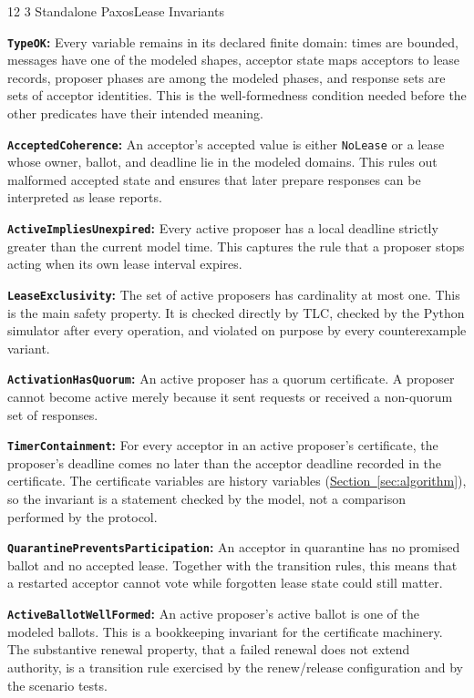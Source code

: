 \documentclass[final,5p,times,twocolumn,number]{elsarticle}
\makeatletter
\newcommand{\code}[1]{\texttt{#1}}
\newcommand{\invitem}[1]{\smallskip\noindent\textbf{#1:} }
\newcommand{\secref}[1]{\hyperref[#1]{Section~\ref*{#1}}}
\renewcommand\subsection{\@startsection{subsection}{2}{\z@}%
           {12\p@ \@plus 6\p@ \@minus 3\p@}%
           {3\p@ \@plus 6\p@ \@minus 3\p@}%
           {\normalfont\normalsize\bfseries}}
\makeatother
\begin{document}
\subsection{Standalone PaxosLease Invariants}

\invitem{\code{TypeOK}}Every variable remains in its declared finite domain: times are bounded, messages have one of the modeled shapes, acceptor state maps acceptors to lease records, proposer phases are among the modeled phases, and response sets are sets of acceptor identities.  This is the well-formedness condition needed before the other predicates have their intended meaning.

\invitem{\code{AcceptedCoherence}}An acceptor's accepted value is either \code{NoLease} or a lease whose owner, ballot, and deadline lie in the modeled domains.  This rules out malformed accepted state and ensures that later prepare responses can be interpreted as lease reports.

\invitem{\code{ActiveImpliesUnexpired}}Every active proposer has a local deadline strictly greater than the current model time.  This captures the rule that a proposer stops acting when its own lease interval expires.

\invitem{\code{LeaseExclusivity}}The set of active proposers has cardinality at most one.  This is the main safety property.  It is checked directly by TLC, checked by the Python simulator after every operation, and violated on purpose by every counterexample variant.

\invitem{\code{ActivationHasQuorum}}An active proposer has a quorum certificate.  A proposer cannot become active merely because it sent requests or received a non-quorum set of responses.

\invitem{\code{TimerContainment}}For every acceptor in an active proposer's certificate, the proposer's deadline comes no later than the acceptor deadline recorded in the certificate.  The certificate variables are history variables (\secref{sec:algorithm}), so the invariant is a statement checked by the model, not a comparison performed by the protocol.

\invitem{\code{QuarantinePreventsParticipation}}An acceptor in quarantine has no promised ballot and no accepted lease.  Together with the transition rules, this means that a restarted acceptor cannot vote while forgotten lease state could still matter.

\invitem{\code{ActiveBallotWellFormed}}An active proposer's active ballot is one of the modeled ballots.  This is a bookkeeping invariant for the certificate machinery.  The substantive renewal property, that a failed renewal does not extend authority, is a transition rule exercised by the renew/release configuration and by the scenario tests.
\end{document}
